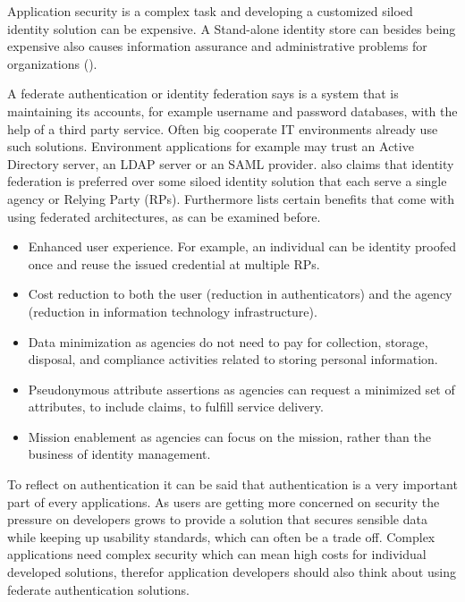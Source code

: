Application security is a complex task and developing a customized siloed identity solution can be expensive. A Stand-alone identity store can besides being expensive also causes information assurance and administrative problems for organizations (\cite{JerichoSystems:IS}). 

  A federate authentication or identity federation says \cite{Boyed:2012:GSOA} is a system that is maintaining its accounts, for example username and password databases, with the help of a third party service. Often big cooperate IT environments already use such solutions. Environment applications for example may trust an Active Directory server, an LDAP server or an SAML provider.    \cite{NIST:2017:DIG} also claims that identity federation is preferred over some siloed identity solution that each serve a single agency or Relying Party (RPs). Furthermore \cite{NIST:2017:DIG} lists certain benefits that come with using federated architectures, as can be examined before. 

\begin{itemize}
\item Enhanced user experience. For example, an individual can be identity proofed once and reuse the issued credential at multiple RPs. 
\item Cost reduction to both the user (reduction in authenticators) and the agency (reduction in information technology infrastructure). 
\item Data minimization as agencies do not need to pay for collection, storage, disposal, and compliance activities related to storing personal information. 
\item Pseudonymous attribute assertions as agencies can request a minimized set of attributes, to include claims, to fulfill service delivery. 
\item Mission enablement as agencies can focus on the mission, rather than the business of identity management.
\end{itemize}

To reflect on authentication it can be said that authentication is a very important part of every applications. As users are getting more concerned on security the pressure on developers grows to provide a solution that secures sensible data while keeping up usability standards, which can often be a trade off. Complex applications need complex security which can mean high costs for individual developed solutions, therefor application developers should also think about using federate authentication solutions. 



